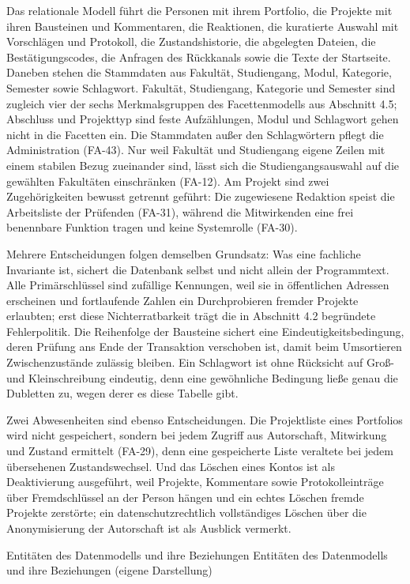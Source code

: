 Das relationale Modell führt die Personen mit ihrem Portfolio, die Projekte mit ihren Bausteinen und Kommentaren, die Reaktionen, die kuratierte Auswahl mit Vorschlägen und Protokoll, die Zustandshistorie, die abgelegten Dateien, die Bestätigungscodes, die Anfragen des Rückkanals sowie die Texte der Startseite. Daneben stehen die Stammdaten aus Fakultät, Studiengang, Modul, Kategorie, Semester sowie Schlagwort. Fakultät, Studiengang, Kategorie und Semester sind zugleich vier der sechs Merkmalsgruppen des Facettenmodells aus Abschnitt 4.5; Abschluss und Projekttyp sind feste Aufzählungen, Modul und Schlagwort gehen nicht in die Facetten ein. Die Stammdaten außer den Schlagwörtern pflegt die Administration (FA-43). Nur weil Fakultät und Studiengang eigene Zeilen mit einem stabilen Bezug zueinander sind, lässt sich die Studiengangsauswahl auf die gewählten Fakultäten einschränken (FA-12). Am Projekt sind zwei Zugehörigkeiten bewusst getrennt geführt: Die zugewiesene Redaktion speist die Arbeitsliste der Prüfenden (FA-31), während die Mitwirkenden eine frei benennbare Funktion tragen und keine Systemrolle (FA-30).

Mehrere Entscheidungen folgen demselben Grundsatz: Was eine fachliche Invariante ist, sichert die Datenbank selbst und nicht allein der Programmtext. Alle Primärschlüssel sind zufällige Kennungen, weil sie in öffentlichen Adressen erscheinen und fortlaufende Zahlen ein Durchprobieren fremder Projekte erlaubten; erst diese Nichterratbarkeit trägt die in Abschnitt 4.2 begründete Fehlerpolitik. Die Reihenfolge der Bausteine sichert eine Eindeutigkeitsbedingung, deren Prüfung ans Ende der Transaktion verschoben ist, damit beim Umsortieren Zwischenzustände zulässig bleiben. Ein Schlagwort ist ohne Rücksicht auf Groß- und Kleinschreibung eindeutig, denn eine gewöhnliche Bedingung ließe genau die Dubletten zu, wegen derer es diese Tabelle gibt.

Zwei Abwesenheiten sind ebenso Entscheidungen. Die Projektliste eines Portfolios wird nicht gespeichert, sondern bei jedem Zugriff aus Autorschaft, Mitwirkung und Zustand ermittelt (FA-29), denn eine gespeicherte Liste veraltete bei jedem übersehenen Zustandswechsel. Und das Löschen eines Kontos ist als Deaktivierung ausgeführt, weil Projekte, Kommentare sowie Protokolleinträge über Fremdschlüssel an der Person hängen und ein echtes Löschen fremde Projekte zerstörte; ein datenschutzrechtlich vollständiges Löschen über die Anonymisierung der Autorschaft ist als Ausblick vermerkt.

%
{Entitäten des Datenmodells und ihre Beziehungen}%
{Entitäten des Datenmodells und ihre Beziehungen (eigene Darstellung)}

